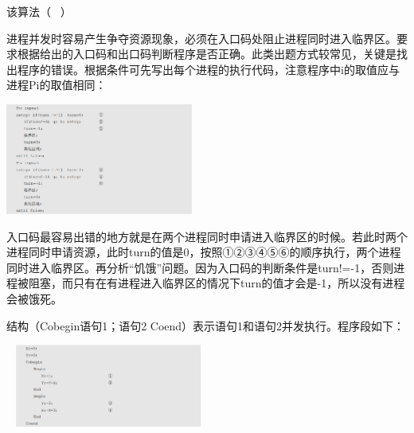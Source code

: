 该算法（ ~）
\par{}
\begin{solution}进程并发时容易产生争夺资源现象，必须在入口码处阻止进程同时进入临界区。要求根据给出的入口码和出口码判断程序是否正确。此类出题方式较常见，关键是找出程序的错误。根据条件可先写出每个进程的执行代码，注意程序中i的取值应与进程Pi的取值相同：

\includegraphics[width=2.42708in,height=1.43750in]{computerassets/16610B857D2D434ECA8B4A1A5391CCF1.png}

入口码最容易出错的地方就是在两个进程同时申请进入临界区的时候。若此时两个进程同时申请资源，此时turn的值是0，按照①②③④⑤⑥的顺序执行，两个进程同时进入临界区。再分析``饥饿''问题。因为入口码的判断条件是turn!=-1，否则进程被阻塞，而只有在有进程进入临界区的情况下turn的值才会是-1，所以没有进程会被饿死。
\end{solution}
\question 结构（Cobegin语句1；语句2 Coend）表示语句1和语句2并发执行。程序段如下：

~
\includegraphics[width=2.42708in,height=1.07292in]{computerassets/4DDE49E225C2295AEB3F23EAC5BBDEF5.png}

